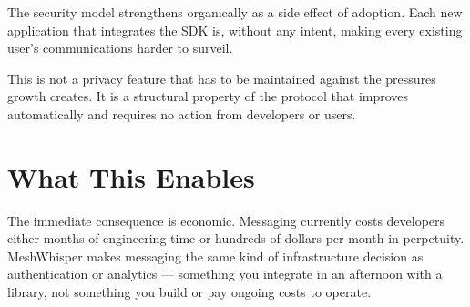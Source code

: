 \documentclass[11pt, a4paper]{article}
\begin{document}
\begin{pullquote}
The security model strengthens organically as a side effect of adoption. Each new application that integrates the SDK is, without any intent, making every existing user's communications harder to surveil.
\end{pullquote}

This is not a privacy feature that has to be maintained against the pressures growth creates. It is a structural property of the protocol that improves automatically and requires no action from developers or users.

\section{What This Enables}

The immediate consequence is economic. Messaging currently costs developers either months of engineering time or hundreds of dollars per month in perpetuity. MeshWhisper makes messaging the same kind of infrastructure decision as authentication or analytics — something you integrate in an afternoon with a library, not something you build or pay ongoing costs to operate.

\vspace{8pt}
\end{document}

